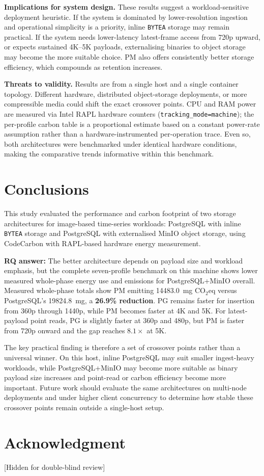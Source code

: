 \documentclass[conference]{IEEEtran}
\begin{document}
\textbf{Implications for system design.} These results suggest a workload-sensitive deployment heuristic. If the system is dominated by lower-resolution ingestion and operational simplicity is a priority, inline \texttt{BYTEA} storage may remain practical. If the system needs lower-latency latest-frame access from 720p upward, or expects sustained 4K--5K payloads, externalising binaries to object storage may become the more suitable choice. PM also offers consistently better storage efficiency, which compounds as retention increases.

\textbf{Threats to validity.} Results are from a single host and a single container topology. Different hardware, distributed object-storage deployments, or more compressible media could shift the exact crossover points. CPU and RAM power are measured via Intel RAPL hardware counters (\texttt{tracking\_mode=machine}); the per-profile carbon table is a proportional estimate based on a constant power-rate assumption rather than a hardware-instrumented per-operation trace. Even so, both architectures were benchmarked under identical hardware conditions, making the comparative trends informative within this benchmark.

\section{Conclusions}
\label{sec:conclusions}

This study evaluated the performance and carbon footprint of two storage architectures for image-based time-series workloads: PostgreSQL with inline \texttt{BYTEA} storage and PostgreSQL with externalised MinIO object storage, using CodeCarbon with RAPL-based hardware energy measurement.

\textbf{RQ answer:} The better architecture depends on payload size and workload emphasis, but the complete seven-profile benchmark on this machine shows lower measured whole-phase energy use and emissions for PostgreSQL+MinIO overall. Measured whole-phase totals show PM emitting 14483.0~mg CO$_2$eq versus PostgreSQL's 19824.8~mg, a \textbf{26.9\% reduction}. PG remains faster for insertion from 360p through 1440p, while PM becomes faster at 4K and 5K. For latest-payload point reads, PG is slightly faster at 360p and 480p, but PM is faster from 720p onward and the gap reaches $8.1\times$ at 5K.

The key practical finding is therefore a set of crossover points rather than a universal winner. On this host, inline PostgreSQL may suit smaller ingest-heavy workloads, while PostgreSQL+MinIO may become more suitable as binary payload size increases and point-read or carbon efficiency become more important. Future work should evaluate the same architectures on multi-node deployments and under higher client concurrency to determine how stable these crossover points remain outside a single-host setup.

\section*{Acknowledgment}
[Hidden for double-blind review]




\end{document}
